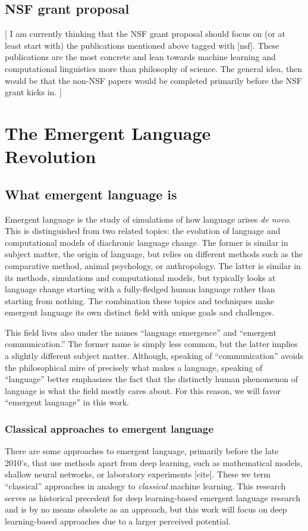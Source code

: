 \documentclass[letterpaper]{report}
\newcommand\bjb[1]{{\color{blue}[#1]}}
\newcommand\cmg[1]{{\color{gray}[#1]}}
\begin{document}
\section{NSF grant proposal}
\bjb{%
I am currently thinking that the NSF grant proposal should focus on (or at least start with) the publications mentioned above tagged with \cmg{nsf}.
These publications are the most concrete and lean towards machine learning and computational linguistics more than philosophy of science.
The general idea, then would be that the non-NSF papers would be completed primarily before the NSF grant kicks in.%
}

\chapter{The Emergent Language Revolution}
\section{What emergent language is}
Emergent language is the study of simulations of how language arises \emph{de novo}.
This is distinguished from two related topics: the evolution of language and computational models of diachronic language change.
The former is similar in subject matter, the origin of language, but relies on different methods such as the comparative method, animal psychology, or anthropology.
The latter is similar in its methods, simulations and computational models, but typically looks at language change starting with a fully-fledged human language rather than starting from nothing.
The combination these topics and techniques make emergent language its own distinct field with unique goals and challenges.

This field lives also under the names ``language emergence'' and ``emergent communication.''
The former name is simply less common, but the latter implies a slightly different subject matter.
Although, speaking of ``communication'' avoids the philosophical mire of precisely what makes a language, speaking of ``language'' better emphasizes the fact that the distinctly human phenomenon of language is what the field mostly cares about.
For this reason, we will favor ``emergent language'' in this work.

\subsection{Classical approaches to emergent language}
There are some approaches to emergent language, primarily before the late 2010's, that use methods apart from deep learning, such as mathematical models, shallow neural networks, or laboratory experiments \cmg{cite}.
These we term ``classical'' approaches in analogy to \emph{classical} machine learning.
This research serves as historical precedent for deep learning-based emergent language research and is by no means obsolete as an approach, but this work will focus on deep learning-based approaches due to a larger perceived potential.
\end{document}
